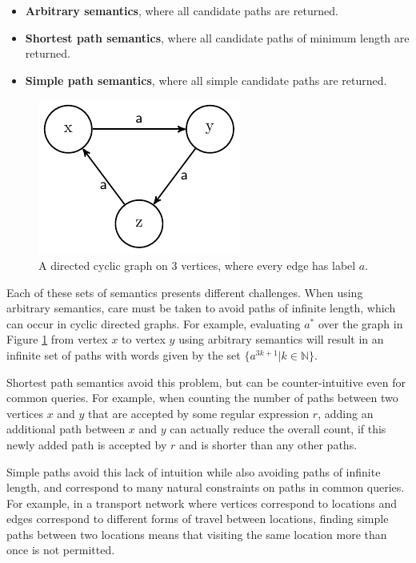 \documentclass{article}
\begin{document}
\begin{itemize}
    \item \textbf{Arbitrary semantics}, where all candidate paths are returned.
    \item \textbf{Shortest path semantics}, where all candidate paths of minimum length are returned.
    \item \textbf{Simple path semantics}, where all simple candidate paths are returned.
\end{itemize}

\begin{figure}
    \centering
    \label{fig:arbitrary_infinite}
    \includegraphics{figures/arbitrary_infinite.pdf}
    \caption{A directed cyclic graph on $3$ vertices, where every edge has label $a$.}
\end{figure}

Each of these sets of semantics presents different challenges. When using arbitrary semantics, care must be taken to avoid paths of infinite length, which can occur in cyclic directed graphs. For example, evaluating $a^*$ over the graph in Figure \ref{fig:arbitrary_infinite} from vertex $x$ to vertex $y$ using arbitrary semantics will result in an infinite set of paths with words given by the set $\{a^{3k+1} | k \in \mathbb{N}\}$.

Shortest path semantics avoid this problem, but can be counter-intuitive even for common queries. For example, when counting the number of paths between two vertices $x$ and $y$ that are accepted by some regular expression $r$, adding an additional path between $x$ and $y$ can actually reduce the overall count, if this newly added path is accepted by $r$ and is shorter than any other paths.

Simple paths avoid this lack of intuition while also avoiding paths of infinite length, and correspond to many natural constraints on paths in common queries. For example, in a transport network where vertices correspond to locations and edges correspond to different forms of travel between locations, finding simple paths between two locations means that visiting the same location more than once is not permitted.
\end{document}
